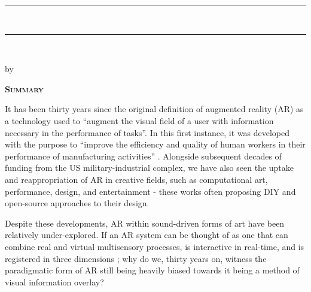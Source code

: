 
\thispagestyle{empty}

 \begin{center}

    {\rule{\linewidth}{1pt}\\%
    \Large \myTitle \par %
    \normalsize \mySubtitle \par}
    \rule{\linewidth}{1pt}\\[0.4cm]
    
	{\normalsize by \myName \par} %
 \end{center}

    {\noindent\Huge\textsc{\textbf{Summary}} \par}

    \noindent It has been thirty years since the original definition of augmented reality (AR) as a technology used to ``augment the visual field of a user with information necessary in the performance of tasks''. In this first instance, it was developed with the purpose to ``improve the efficiency and quality of human workers in their performance of manufacturing activities'' \citep{caudell1992}. Alongside subsequent decades of funding from the US military-industrial complex, we have also seen the uptake and reappropriation of AR in creative fields, such as computational art, performance, design, and entertainment - these works often proposing DIY and open-source approaches to their design. 
    
    \noindent Despite these developments, AR within sound-driven forms of art have been relatively under-explored. If an AR system can be thought of as one that can combine real and virtual multisensory processes, is interactive in real-time, and is registered in three dimensions \citep{azuma1997}; why do we, thirty years on, witness the paradigmatic form of AR still being heavily biased \citep{billinghurst2015} towards it being a method of visual information overlay?
    
